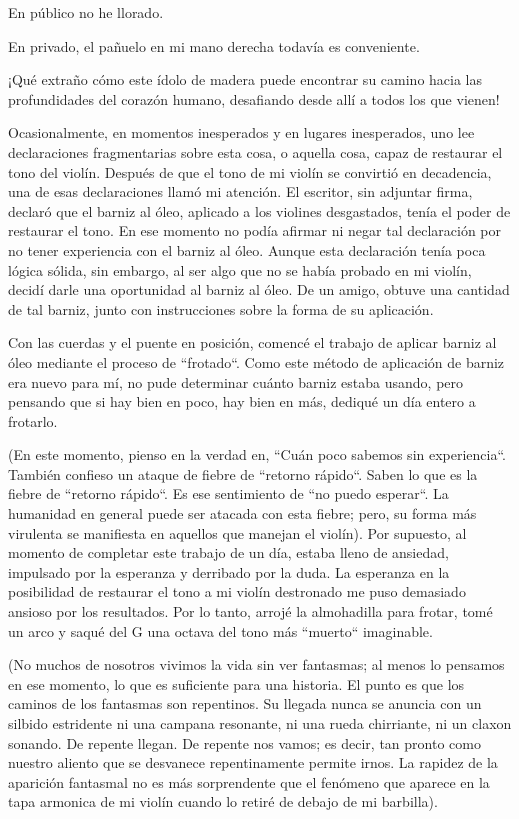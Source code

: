 \documentclass[12pt]{book}
\begin{document}
En público no he llorado.

En privado, el pañuelo en mi mano derecha todavía es conveniente.

¡Qué extraño cómo este ídolo de madera puede encontrar su camino hacia las profundidades del corazón humano, desafiando desde allí a todos los que vienen!

Ocasionalmente, en momentos inesperados y en lugares inesperados, uno lee declaraciones fragmentarias sobre esta cosa, o aquella cosa, capaz de restaurar el tono del violín. Después de que el tono de mi violín se convirtió en decadencia, una de esas declaraciones llamó mi atención. El escritor, sin adjuntar firma, declaró que el barniz al óleo, aplicado a los violines desgastados, tenía el poder de restaurar el tono. En ese momento no podía afirmar ni negar tal declaración por no tener experiencia con el barniz al óleo. Aunque esta declaración tenía poca lógica sólida, sin embargo, al ser algo que no se había probado en mi violín, decidí darle una oportunidad al barniz al óleo. De un amigo, obtuve una cantidad de tal barniz, junto con instrucciones sobre la forma de su aplicación.

Con las cuerdas y el puente en posición, comencé el trabajo de aplicar barniz al óleo mediante el proceso de ``frotado``. Como este método de aplicación de barniz era nuevo para mí, no pude determinar cuánto barniz estaba usando, pero pensando que si hay bien en poco, hay bien en más, dediqué un día entero a frotarlo.

(En este momento, pienso en la verdad en, ``Cuán poco sabemos sin experiencia``. También confieso un ataque de fiebre de ``retorno rápido``. Saben lo que es la fiebre de ``retorno rápido``. Es ese sentimiento de ``no puedo esperar``. La humanidad en general puede ser atacada con esta fiebre; pero, su forma más virulenta se manifiesta en aquellos que manejan el violín). Por supuesto, al momento de completar este trabajo de un día, estaba lleno de ansiedad, impulsado por la esperanza y derribado por la duda. La esperanza en la posibilidad de restaurar el tono a mi violín destronado me puso demasiado ansioso por los resultados. Por lo tanto, arrojé la almohadilla para frotar, tomé un arco y saqué del G una octava del tono más ``muerto`` imaginable.

(No muchos de nosotros vivimos la vida sin ver fantasmas; al menos lo pensamos en ese momento, lo que es suficiente para una historia. El punto es que los caminos de los fantasmas son repentinos. Su llegada nunca se anuncia con un silbido estridente ni una campana resonante, ni una rueda chirriante, ni un claxon sonando. De repente llegan. De repente nos vamos; es decir, tan pronto como nuestro aliento que se desvanece repentinamente permite irnos. La rapidez de la aparición fantasmal no es más sorprendente que el fenómeno que aparece en la tapa armonica de mi violín cuando lo retiré de debajo de mi barbilla).
\end{document}
